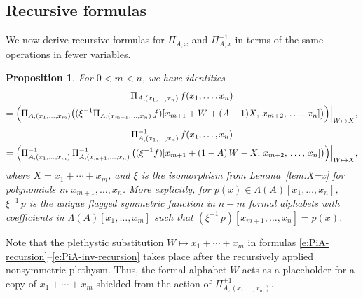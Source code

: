 \documentclass[12pt]{amsart}
\newtheorem{prop}[thm]{Proposition}
\theoremstyle{definition}
\theoremstyle{remark}
\begin{document}
\subsection{Recursive formulas}
\label{ss:PiA-recursions}

We now derive recursive formulas for $\Pi _{A,x}$ and $\Pi
_{A,x}^{-1}$ in terms of the same operations in fewer variables.

\begin{prop}\label{prop:PiA-recursion}
For $0<m<n$, we have identities
\begin{multline}\label{e:PiA-recursion}
\Pi _{A,(x_1,\ldots,x_n)} \, f(x_{1},\ldots,x_{n})\\
 = \Bigl( \Pi _{A,(x_{1},\ldots,x_{m})}\bigl((\xi ^{-1} \Pi
_{A,(x_{m+1},\ldots,x_{n})}\, f)[x_{m+1}+W+(A-1)X,\, x_{m+2},\,
\ldots,\, x_{n}]\bigr) \Bigr) \Bigr|_{W\mapsto X},
\end{multline}
\vspace{-2ex}
\begin{multline}\label{e:PiA-inv-recursion}
\Pi _{A,(x_1,\ldots,x_n)}^{-1} \,f(x_{1},\ldots,x_{n}) \\
= \Bigl( \Pi _{A,(x_{1},\ldots,x_{m})}^{-1} \, \Pi
_{A,(x_{m+1},\ldots,x_{n})}^{-1}\, \bigl( (\xi ^{-1}
f)[x_{m+1}+(1-A)\, W - X,\, x_{m+2},\, \ldots,\, x_{n}] \bigr) \Bigr)
\Bigr|_{W\mapsto X},
\end{multline}
where $X = x_{1}+\cdots +x_{m}$, and $\xi $ is the isomorphism from
Lemma~\ref{lem:X=x} for polynomials in $x_{m+1},\ldots,x_{n}$.  More
explicitly, for $p(x)\in \Lambda (A)[x_{1},\ldots,x_{n}]$, $\xi
^{-1}\, p$ is the unique flagged symmetric function in $n-m$ formal alphabets
with coefficients in $\Lambda (A)[x_{1},\ldots,x_{m}]$ such that $(\xi
^{-1}\, p)[x_{m+1},\ldots,x_{n}] = p(x)$.
\end{prop}

Note that the plethystic substitution $W\mapsto x_{1}+\cdots +x_{m}$
in formulas \eqref{e:PiA-recursion}--\eqref{e:PiA-inv-recursion} takes
place after the recursively applied nonsymmetric plethysm.  Thus, the
formal alphabet $W$ acts as a placeholder for a copy of $x_{1}+\cdots
+x_{m}$ shielded from the action of $\Pi
_{A,(x_{1},\ldots,x_{m})}^{\pm 1}$.
\end{document}
